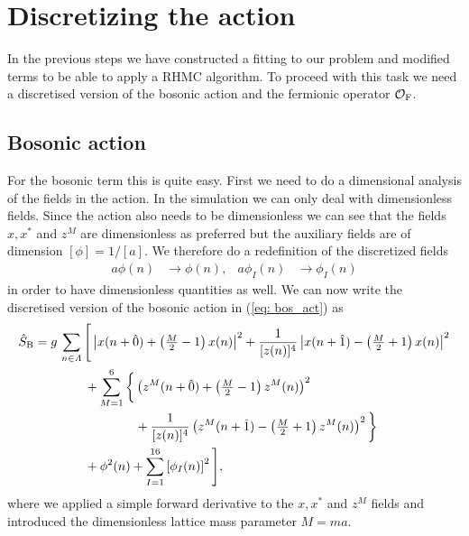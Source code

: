 \section{Discretizing the action}
In the previous steps we have constructed a  fitting to our problem and modified terms to be able to apply a RHMC algorithm. To proceed with this task we need a discretised version of the bosonic action and the fermionic operator $\mathcal{O}_{\rm F}$.
%
%
%
%
%
%
\subsection{Bosonic action}
For the bosonic term this is quite easy. First we need to do a dimensional analysis of the fields in the action. In the simulation we can only deal with dimensionless fields. Since the action also needs to be dimensionless we can see that the fields $x,x^{*}$ and $z^{M}$ are dimensionless as preferred but the auxiliary fields are of dimension $[\phi]=1/[a]$. We therefore do a redefinition of the discretized fields
%
%
\begin{align}
a\phi(n) &\to \phi(n), & a\phi_{I}(n) &\to \phi_{I}(n)
\end{align}
%
%
in order to have dimensionless quantities as well. We can now write the discretised version of the bosonic action in (\ref{eq: bos_act}) as
%
%
\begin{align}
\hat{S}_{\rm B} &= g\, \sum\limits_{n\in\mathit{\Lambda}} \Bigg[ \left\vert x(n+\hat{0}) + \left(\tfrac{M}{2}-1\right) x(n) \right\vert^{2}
+ \frac{1}{[z(n)]^{4}} \left\vert x(n+\hat{1}) - \left(\tfrac{M}{2}+1\right) x(n) \right\vert^{2} \notag\\
%
%
&\qquad\qquad + \sum\limits_{M=1}^{6} \bigg\lbrace \left(z^{M}(n+\hat{0}) + \left(\tfrac{M}{2} -1\right)z^{M}(n) \right)^{2} \\
%
%
&\qquad\qquad\qquad\qquad + \frac{1}{[z(n)]^{4}} \left( z^{M}(n+\hat{1}) -\left(\tfrac{M}{2}+1\right) z^{M}(n) \right)^{2} \bigg\rbrace \notag \\
&\qquad\qquad +\phi^{2}(n) + \sum\limits_{I=1}^{16}\left[\phi_{I}(n)\right]^{2} \Bigg], \notag
\end{align}
%
%
where we applied a simple forward derivative to the $x,x^{*}$ and $z^{M}$ fields and introduced the dimensionless lattice mass parameter $M=ma$.
%
%
%
%
%
%
%
%
